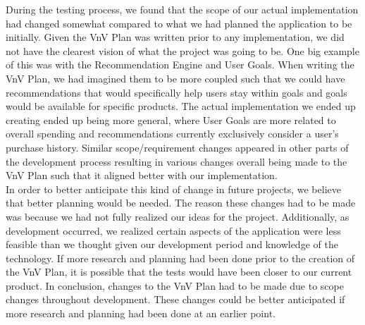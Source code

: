 \documentclass[12pt, titlepage]{article}
\begin{document}
During the testing process, we found that the scope of our actual
implementation had changed somewhat compared to what we had planned the application to be
initially. Given the VnV Plan was written prior to any implementation, we did not have
the clearest vision of what the project was going to be. One big example of this was
with the Recommendation Engine and User Goals. When writing the VnV Plan, we had imagined them
to be more coupled such that we could have recommendations that would specifically help users
stay within goals and goals would be available for specific products. The actual implementation
we ended up creating ended up being more general, where User Goals are more related to overall
spending and recommendations currently exclusively consider a user's purchase history.
Similar scope/requirement changes appeared in other parts of the development process resulting in
various changes overall being made to the VnV Plan such that it aligned better with our implementation.\\

In order to better anticipate this kind of change in future projects, we believe that better planning
would be needed. The reason these changes had to be made was because we had not fully realized our ideas
for the project. Additionally, as development occurred, we realized certain aspects of the application
were less feasible than we thought given our development period and knowledge of the technology. If more research
and planning had been done prior to the creation of the VnV Plan, it is possible that the tests would have been closer
to our current product. In conclusion, changes to the VnV Plan had to be made due to scope changes throughout
development. These changes could be better anticipated if more research and planning had been done at
an earlier point.
\end{document}
